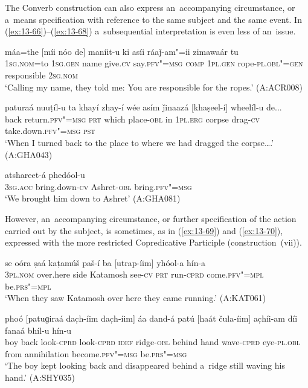  The Converb construction can also express an~accompanying circumstance, or a~means specification with reference to the same subject and the same event. In (\ref{ex:13-66})--(\ref{ex:13-68}) a~subsequential interpretation is even less of an~issue.

\begin{exe}
\ex
\label{ex:13-66}
\gll máa=the [míi nóo de] maníit-u ki asíi ráaǰ-am"=ii zimawaár tu  \\
\textsc{1sg.nom}=to \textsc{1sg.gen} name give.\textsc{cv} say.\textsc{pfv"=msg} \textsc{comp}  \textsc{1pl.gen} rope-\textsc{pl.obl"=gen} responsible \textsc{2sg.nom}  \\
\glt `Calling my name, they told me: You are responsible for the ropes.' (A:ACR008)

\ex
\label{ex:13-67}
\gll paturaá nuuṭíl-u ta khayí zhay-í wée asím ǰinaazá [khaṣeel-í] wheelíl-u de... \\
back return.\textsc{pfv"=msg} \textsc{prt} which place-\textsc{obl} in \textsc{1pl.erg}  corpse drag-\textsc{cv} take.down.\textsc{pfv"=msg} \textsc{pst} \\
\glt `When I turned back to the place to where we had dragged the corpse{\ldots}.' (A:GHA043)

\ex
\label{ex:13-68}
 atshareet-á phedóol-u \\
\textsc{3sg.acc} bring.down-\textsc{cv} Ashret-\textsc{obl} bring.\textsc{pfv"=msg} \\
\glt `We brought him down to Ashret' (A:GHA081) 
\end{exe}

However, an~accompanying circumstance, or further specification of the action carried out by the subject, is sometimes, as in (\ref{ex:13-69}) and (\ref{ex:13-70}), expressed with the more restricted Copredicative Participle (construction~(vii)).

\begin{exe}
\ex
\label{ex:13-69}
\gll se oóra ṣaá kaṭamúš paš-í ba [utrap-íim] yhóol-a hín-a \\
\textsc{3pl.nom} over.here side Katamosh see-\textsc{cv} \textsc{prt} run-\textsc{cprd} come.\textsc{pfv"=mpl} be.\textsc{prs"=mpl} \\
\glt `When they saw Katamosh over here they came running.' (A:KAT061)

\ex
\label{ex:13-70}
\gll phoó [patuɡiraá dac̣h-íim dac̣h-íim] áa dand-á patú [haát čula-íim] ac̣híi-am díi fanaá bhíl-u hín-u \\
boy back look-\textsc{cprd} look-\textsc{cprd} \textsc{idef}  ridge-\textsc{obl} behind hand wave-\textsc{cprd} eye-\textsc{pl.obl} from  annihilation become.\textsc{pfv"=msg} be.\textsc{prs"=msg} \\
\glt `The boy kept looking back and disappeared behind a~ridge still waving his hand.' (A:SHY035) 
\end{exe}

